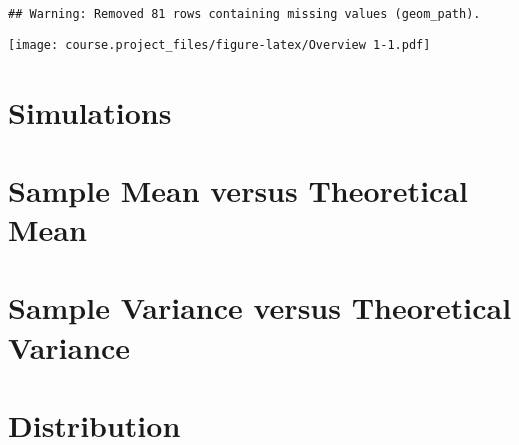 \documentclass[]{article}
\begin{document}
\begin{verbatim}
## Warning: Removed 81 rows containing missing values (geom_path).
\end{verbatim}

\texttt{[image: course.project\_files/figure-latex/Overview 1-1.pdf]}

\section{Simulations}\label{simulations}

\section{Sample Mean versus Theoretical
Mean}\label{sample-mean-versus-theoretical-mean}

\section{Sample Variance versus Theoretical
Variance}\label{sample-variance-versus-theoretical-variance}

\section{Distribution}\label{distribution}
\end{document}
